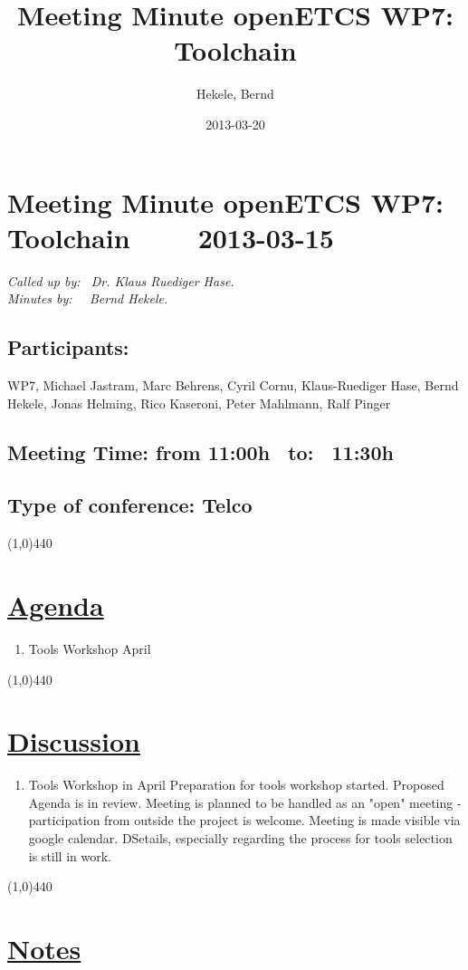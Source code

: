 \documentclass[a4paper]{article}
\title{Meeting Minute openETCS WP7: Toolchain}
\author{Hekele, Bernd}
\date{2013-03-20}
\begin{document}
\section*{\large{Meeting Minute openETCS WP7: Toolchain \ \ \ \ 2013-03-15}}

\emph{Called up by: \ Dr. Klaus Ruediger Hase.}\\
\emph{Minutes by: \ \  Bernd Hekele.}

\subsection*{Participants:} WP7, 
Michael Jastram, 
Marc Behrens, 
Cyril Cornu, 
Klaus-Ruediger Hase, 
Bernd Hekele,
Jonas Helming,
Rico Kaseroni, 
Peter Mahlmann, 
Ralf Pinger\\


\subsection*{Meeting Time: from 11:00h \ to: \ 11:30h}

\subsection*{Type of conference: Telco}

\line(1,0){440}
\section*{\underline{Agenda}}
\begin{enumerate}
\item Tools Workshop April
\end{enumerate}
\line(1,0){440}
\section*{\underline{Discussion}}

\begin{enumerate}

\item Tools Workshop in April
Preparation for tools workshop started. Proposed Agenda is in review. Meeting is planned to be handled as an "open" meeting - participation from outside the project is welcome. Meeting is made visible via google calendar. DSetails, especially regarding the process for tools selection is still in work.

\end{enumerate}

\line(1,0){440}
\section*{\underline{Notes}}
\end{document}
